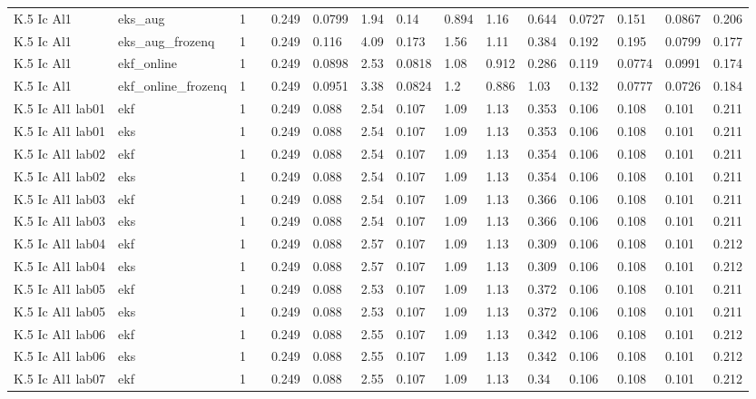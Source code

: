 \begin{table}[t]
\begin{tabular}{lllllllllllllll}
K.5 Ic Al1 & eks\_aug & 1 &  & 0.249 & 0.0799 & 1.94 & 0.14 & 0.894 & 1.16 & 0.644 & 0.0727 & 0.151 & 0.0867 & 0.206 \\
K.5 Ic Al1 & eks\_aug\_frozenq & 1 &  & 0.249 & 0.116 & 4.09 & 0.173 & 1.56 & 1.11 & 0.384 & 0.192 & 0.195 & 0.0799 & 0.177 \\
K.5 Ic Al1 & ekf\_online & 1 &  & 0.249 & 0.0898 & 2.53 & 0.0818 & 1.08 & 0.912 & 0.286 & 0.119 & 0.0774 & 0.0991 & 0.174 \\
K.5 Ic Al1 & ekf\_online\_frozenq & 1 &  & 0.249 & 0.0951 & 3.38 & 0.0824 & 1.2 & 0.886 & 1.03 & 0.132 & 0.0777 & 0.0726 & 0.184 \\
K.5 Ic Al1 lab01 & ekf & 1 &  & 0.249 & 0.088 & 2.54 & 0.107 & 1.09 & 1.13 & 0.353 & 0.106 & 0.108 & 0.101 & 0.211 \\
K.5 Ic Al1 lab01 & eks & 1 &  & 0.249 & 0.088 & 2.54 & 0.107 & 1.09 & 1.13 & 0.353 & 0.106 & 0.108 & 0.101 & 0.211 \\
K.5 Ic Al1 lab02 & ekf & 1 &  & 0.249 & 0.088 & 2.54 & 0.107 & 1.09 & 1.13 & 0.354 & 0.106 & 0.108 & 0.101 & 0.211 \\
K.5 Ic Al1 lab02 & eks & 1 &  & 0.249 & 0.088 & 2.54 & 0.107 & 1.09 & 1.13 & 0.354 & 0.106 & 0.108 & 0.101 & 0.211 \\
K.5 Ic Al1 lab03 & ekf & 1 &  & 0.249 & 0.088 & 2.54 & 0.107 & 1.09 & 1.13 & 0.366 & 0.106 & 0.108 & 0.101 & 0.211 \\
K.5 Ic Al1 lab03 & eks & 1 &  & 0.249 & 0.088 & 2.54 & 0.107 & 1.09 & 1.13 & 0.366 & 0.106 & 0.108 & 0.101 & 0.211 \\
K.5 Ic Al1 lab04 & ekf & 1 &  & 0.249 & 0.088 & 2.57 & 0.107 & 1.09 & 1.13 & 0.309 & 0.106 & 0.108 & 0.101 & 0.212 \\
K.5 Ic Al1 lab04 & eks & 1 &  & 0.249 & 0.088 & 2.57 & 0.107 & 1.09 & 1.13 & 0.309 & 0.106 & 0.108 & 0.101 & 0.212 \\
K.5 Ic Al1 lab05 & ekf & 1 &  & 0.249 & 0.088 & 2.53 & 0.107 & 1.09 & 1.13 & 0.372 & 0.106 & 0.108 & 0.101 & 0.211 \\
K.5 Ic Al1 lab05 & eks & 1 &  & 0.249 & 0.088 & 2.53 & 0.107 & 1.09 & 1.13 & 0.372 & 0.106 & 0.108 & 0.101 & 0.211 \\
K.5 Ic Al1 lab06 & ekf & 1 &  & 0.249 & 0.088 & 2.55 & 0.107 & 1.09 & 1.13 & 0.342 & 0.106 & 0.108 & 0.101 & 0.212 \\
K.5 Ic Al1 lab06 & eks & 1 &  & 0.249 & 0.088 & 2.55 & 0.107 & 1.09 & 1.13 & 0.342 & 0.106 & 0.108 & 0.101 & 0.212 \\
K.5 Ic Al1 lab07 & ekf & 1 &  & 0.249 & 0.088 & 2.55 & 0.107 & 1.09 & 1.13 & 0.34 & 0.106 & 0.108 & 0.101 & 0.212 \\

\end{tabular}
\end{table}
